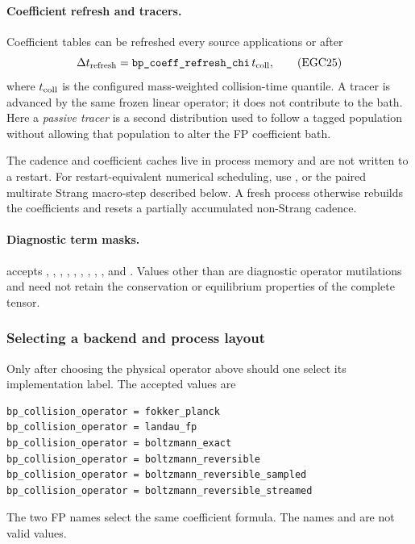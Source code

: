 \paragraph{Coefficient refresh and tracers.}
Coefficient tables can be refreshed every
 source applications or after
\[
 \Delta t_{\rm refresh}
 =\code{bp_coeff_refresh_chi}\,t_{\rm coll},              \tag{EGC25}
\]
where \(t_{\rm coll}\) is the configured mass-weighted collision-time
quantile.  A tracer is advanced by the same frozen linear operator; it does
not contribute to the bath.  Here a \emph{passive tracer} is a second
distribution used to follow a tagged population without allowing that
population to alter the FP coefficient bath.

The cadence and coefficient caches live in process memory and are not written
to a restart.  For restart-equivalent numerical scheduling, use
, or the paired multirate Strang macro-step
described below.  A fresh process otherwise rebuilds the coefficients and
resets a partially accumulated non-Strang cadence.

\paragraph{Diagnostic term masks.}
 accepts
, , , ,
, , , ,
, and .  Values other than  are
diagnostic operator mutilations and need not retain the conservation or
equilibrium properties of the complete tensor.

\subsubsection{Selecting a backend and process layout}

Only after choosing the physical operator above should one select its
implementation label.  The accepted values are
\begin{lstlisting}
bp_collision_operator = fokker_planck
bp_collision_operator = landau_fp
bp_collision_operator = boltzmann_exact
bp_collision_operator = boltzmann_reversible
bp_collision_operator = boltzmann_reversible_sampled
bp_collision_operator = boltzmann_reversible_streamed
\end{lstlisting}
The two FP names select the same coefficient formula.  The names
 and  are not
valid values.

